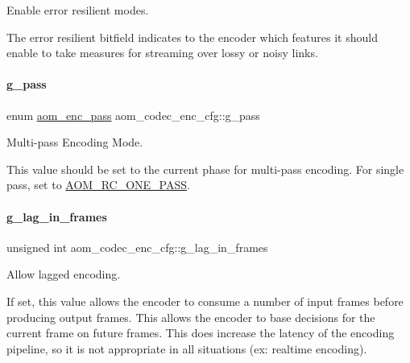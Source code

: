 Enable error resilient modes. 

The error resilient bitfield indicates to the encoder which features it should enable to take measures for streaming over lossy or noisy links. \mbox{\label{structaom__codec__enc__cfg_aad58e4d10c7904d50ce959aef202dc64}} 
\paragraph{\texorpdfstring{g\+\_\+pass}{g\_pass}}
{\footnotesize\ttfamily enum \hyperlink{group__encoder_ga92b6709b58dc3435e3ba652da562eda1}{aom\+\_\+enc\+\_\+pass} aom\+\_\+codec\+\_\+enc\+\_\+cfg\+::g\+\_\+pass}



Multi-\/pass Encoding Mode. 

This value should be set to the current phase for multi-\/pass encoding. For single pass, set to \hyperlink{group__encoder_gga92b6709b58dc3435e3ba652da562eda1a1b4b8ee9c1910fc59ac9dfd9700f3f02}{A\+O\+M\+\_\+\+R\+C\+\_\+\+O\+N\+E\+\_\+\+P\+A\+SS}. \mbox{\label{structaom__codec__enc__cfg_a614a49318f2011cc8735d7e51b910fa4}} 
\paragraph{\texorpdfstring{g\+\_\+lag\+\_\+in\+\_\+frames}{g\_lag\_in\_frames}}
{\footnotesize\ttfamily unsigned int aom\+\_\+codec\+\_\+enc\+\_\+cfg\+::g\+\_\+lag\+\_\+in\+\_\+frames}



Allow lagged encoding. 

If set, this value allows the encoder to consume a number of input frames before producing output frames. This allows the encoder to base decisions for the current frame on future frames. This does increase the latency of the encoding pipeline, so it is not appropriate in all situations (ex\+: realtime encoding).

